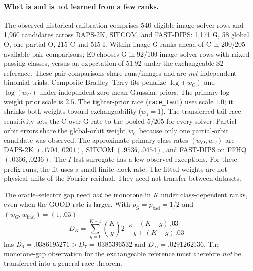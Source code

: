 \paragraph{What is and is not learned from a few ranks.}
The observed historical calibration comprises 540 eligible image--solver
rows and 1,960 candidates across DAPS-2K, SITCOM, and FAST-DIPS:
1,171 G, 58 global O, one partial O, 215 C and 515 I.
Within-image G ranks ahead of C in 200/205 available pair comparisons;
E0 chooses G in 92/100 image--solver rows with mixed passing classes,
versus an expectation of 51.92 under the exchangeable S2 reference.
These pair comparisons share runs/images and are \emph{not}
independent binomial trials. Composite Bradley--Terry fits penalize $\log(w_O)$ and
$\log(w_C)$ under independent zero-mean Gaussian priors.
The primary log-weight prior scale is $2.5$.
The tighter-prior race (\texttt{race\_tau1}) uses scale $1.0$;
it shrinks both weights toward exchangeability ($w_j=1$).
The transferred-tail race sensitivity sets the C-over-G
rate to the pooled $5/205$ for every solver.
Partial-orbit errors share the global-orbit weight $w_O$
because only one partial-orbit candidate was observed.
The approximate primary class rates $(w_O,w_C)$ are DAPS-2K $(.1704,.0201)$, SITCOM
$(.9536,.0454)$, and FAST-DIPS on FFHQ $(.0366,.0236)$.
The $I$-last surrogate has a few observed exceptions.
For these prefix runs, the fit uses a small finite clock rate.
The fitted weights are not physical units of the Fourier residual.
They need not transfer between datasets.

The oracle--selector gap need \emph{not} be monotone in $K$ under
class-dependent ranks, even when the GOOD rate is larger.
With $p_G=p_{\mathrm{bad}}=1/2$ and
$(w_G,w_{\mathrm{bad}})=(1,.03)$,
\[
 D_K=\sum_{g=1}^{K-1}\binom Kg2^{-K}
 \frac{(K-g)\,.03}{g+(K-g)\,.03}
\]
has $D_6=.0386195271>D_7=.0385396532$ and
$D_\infty=.0291262136$. The monotone-gap observation for the
exchangeable reference must therefore \emph{not} be transferred
into a general race theorem.


